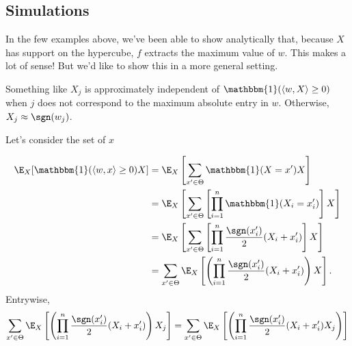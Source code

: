 \documentclass{article}
\begin{document}
\subsection{Simulations}
In the few examples above, we've been able to show analytically that, because $X$ has support on the hypercube, $f$ extracts the maximum value of $w$.
This makes a lot of sense!
But we'd like to show this in a more general setting.

Something like $X_j$ is approximately independent of $\mathbbm{1}( \langle w, X \rangle \geq 0 )$ when $j$ does not correspond to the maximum absolute entry in $w$.
Otherwise, $X_j \approx \sgn(w_j)$.

Let's consider the set of $x$



\begin{align}
  \E_X[ \mathbbm{1}(\langle w, x \rangle \geq 0) X ]
  &= \E_X\left[ \sum_{ x' \in \Theta } \mathbbm{1}(X = x') X\right] \\
  &= \E_X\left[ \sum_{ x' \in \Theta } \left[\prod_{i=1}^{n} \mathbbm{1}(X_i = x_i')\right] X\right] \\
  &= \E_X\left[ \sum_{ x' \in \Theta } \left[\prod_{i=1}^{n} \frac{\sgn(x_i')}{2}( X_i + x_i' ) \right] X\right] \\
  &= \sum_{ x' \in \Theta } \E_X\left[ \left(\prod_{i=1}^{n} \frac{\sgn(x_i')}{2}( X_i + x_i' )\right) X\right].
\end{align}
Entrywise,
\begin{align*}
  \sum_{ x' \in \Theta } \E_X\left[ \left(\prod_{i=1}^{n} \frac{\sgn(x_i')}{2}( X_i + x_i' )\right) X_j \right]
  &= \sum_{ x' \in \Theta } \E_X\left[ \left(\prod_{i=1}^{n} \frac{\sgn(x_i')}{2}( X_i + x_i' ) X_j \right) \right] \\
\end{align*}
\end{document}
